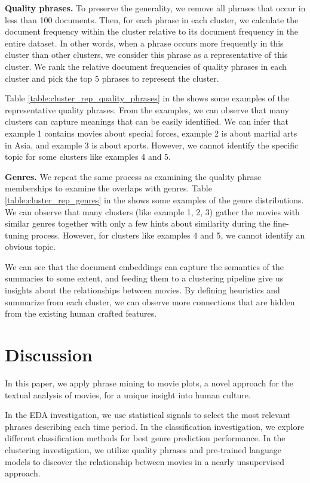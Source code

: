 \documentclass{article}
\begin{document}
\begin{multicols}{2}
\textbf{Quality phrases.} To preserve the generality, we remove all phrases that occur in less than 100 documents. Then, for each phrase in each cluster, we calculate the document frequency within the cluster relative to its document frequency in the entire dataset. In other words, when a phrase occurs more frequently in this cluster than other clusters, we consider this phrase as a representative of this cluster. We rank the relative document frequencies of quality phrases in each cluster and pick the top 5 phrases to represent the cluster. 



Table \ref{table:cluster_rep_quality_phrases} in the  shows some examples of the representative quality phrases. From the examples, we can observe that many clusters can capture meanings that can be easily identified. We can infer that example 1 contains movies about special forces, example 2 is about martial arts in Asia, and example 3 is about sports. However, we cannot identify the specific topic for some clusters like examples 4 and 5.

\textbf{Genres.} We repeat the same process as examining the quality phrase memberships to examine the overlaps with genres. Table \ref{table:cluster_rep_genres} in the  shows some examples of the genre distributions. We can observe that many clusters (like example 1, 2, 3) gather the movies with similar genres together with only a few hints about similarity during the fine-tuning process. However, for clusters like examples 4 and 5, we cannot identify an obvious topic.

We can see that the document embeddings can capture the semantics of the summaries to some extent, and feeding them to a clustering pipeline give us insights about the relationships between movies. By defining heuristics and summarize from each cluster, we can observe more connections that are hidden from the existing human crafted features.


\section{Discussion} %
In this paper, we apply phrase mining to movie plots, a novel approach for the textual analysis of movies, for a unique insight into human culture.

In the EDA investigation, we use statistical signals to select the most relevant phrases describing each time period. In the classification investigation, we explore different classification methods for best genre prediction performance. In the clustering investigation, we utilize quality phrases and pre-trained language models to discover the relationship between movies in a nearly unsupervised approach.


\end{multicols}
\end{document}
